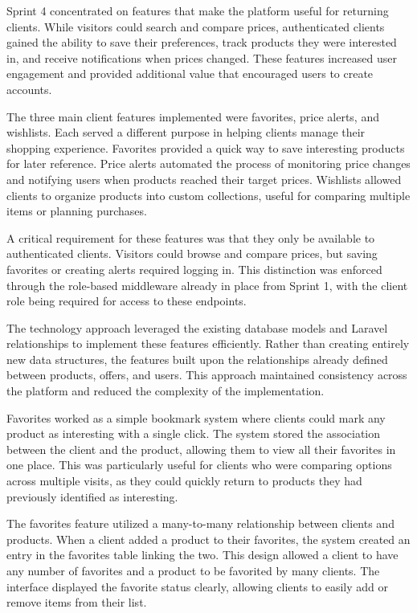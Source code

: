 Sprint 4 concentrated on features that make the platform useful
for returning clients. While visitors could search and compare
prices, authenticated clients gained the ability to save their
preferences, track products they were interested in, and receive
notifications when prices changed. These features increased user
engagement and provided additional value that encouraged users
to create accounts.

The three main client features implemented were favorites, price
alerts, and wishlists. Each served a different purpose in helping
clients manage their shopping experience. Favorites provided a
quick way to save interesting products for later reference. Price
alerts automated the process of monitoring price changes and
notifying users when products reached their target prices.
Wishlists allowed clients to organize products into custom
collections, useful for comparing multiple items or planning
purchases.

A critical requirement for these features was that they only
be available to authenticated clients. Visitors could browse and
compare prices, but saving favorites or creating alerts required
logging in. This distinction was enforced through the role-based
middleware already in place from Sprint 1, with the client role
being required for access to these endpoints.

The technology approach leveraged the existing database models
and Laravel relationships to implement these features efficiently.
Rather than creating entirely new data structures, the features
built upon the relationships already defined between products,
offers, and users. This approach maintained consistency across
the platform and reduced the complexity of the implementation.

Favorites worked as a simple bookmark system where clients could
mark any product as interesting with a single click. The system
stored the association between the client and the product,
allowing them to view all their favorites in one place. This
was particularly useful for clients who were comparing options
across multiple visits, as they could quickly return to products
they had previously identified as interesting.

The favorites feature utilized a many-to-many relationship
between clients and products. When a client added a product to
their favorites, the system created an entry in the favorites
table linking the two. This design allowed a client to have
any number of favorites and a product to be favorited by many
clients. The interface displayed the favorite status clearly,
allowing clients to easily add or remove items from their list.

